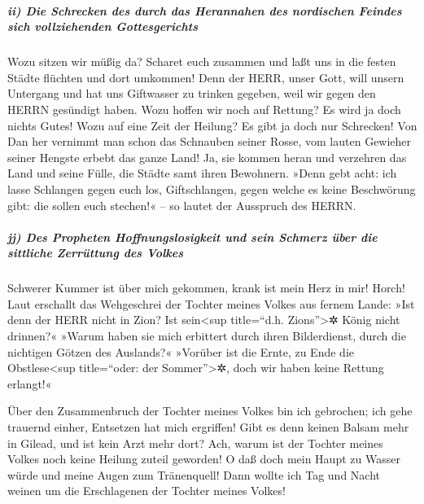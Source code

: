 \hypertarget{ii-die-schrecken-des-durch-das-herannahen-des-nordischen-feindes-sich-vollziehenden-gottesgerichts}{%
\subparagraph{ii) Die Schrecken des durch das Herannahen des nordischen
Feindes sich vollziehenden
Gottesgerichts}\label{ii-die-schrecken-des-durch-das-herannahen-des-nordischen-feindes-sich-vollziehenden-gottesgerichts}}

Wozu sitzen wir müßig da? Scharet euch zusammen und laßt
uns in die festen Städte flüchten und dort umkommen! Denn der HERR,
unser Gott, will unsern Untergang und hat uns Giftwasser zu trinken
gegeben, weil wir gegen den HERRN gesündigt haben. Wozu
hoffen wir noch auf Rettung? Es wird ja doch nichts Gutes! Wozu auf eine
Zeit der Heilung? Es gibt ja doch nur Schrecken! Von Dan
her vernimmt man schon das Schnauben seiner Rosse, vom lauten Gewieher
seiner Hengste erbebt das ganze Land! Ja, sie kommen heran und verzehren
das Land und seine Fülle, die Städte samt ihren Bewohnern.
»Denn gebt acht: ich lasse Schlangen gegen euch los,
Giftschlangen, gegen welche es keine Beschwörung gibt: die sollen euch
stechen!« -- so lautet der Ausspruch des HERRN.

\hypertarget{jj-des-propheten-hoffnungslosigkeit-und-sein-schmerz-uxfcber-die-sittliche-zerruxfcttung-des-volkes}{%
\subparagraph{jj) Des Propheten Hoffnungslosigkeit und sein Schmerz über
die sittliche Zerrüttung des
Volkes}\label{jj-des-propheten-hoffnungslosigkeit-und-sein-schmerz-uxfcber-die-sittliche-zerruxfcttung-des-volkes}}

Schwerer Kummer ist über mich gekommen, krank ist mein
Herz in mir! Horch! Laut erschallt das Wehgeschrei der
Tochter meines Volkes aus fernem Lande: »Ist denn der HERR nicht in
Zion? Ist sein\textless sup title=``d.h. Zions''\textgreater✲ König
nicht drinnen?« »Warum haben sie mich erbittert durch ihren
Bilderdienst, durch die nichtigen Götzen des Auslands?«
»Vorüber ist die Ernte, zu Ende die Obstlese\textless sup
title=``oder: der Sommer''\textgreater✲, doch wir haben keine Rettung
erlangt!«

Über den Zusammenbruch der Tochter meines Volkes bin ich
gebrochen; ich gehe trauernd einher, Entsetzen hat mich ergriffen!
Gibt es denn keinen Balsam mehr in Gilead, und ist kein
Arzt mehr dort? Ach, warum ist der Tochter meines Volkes noch keine
Heilung zuteil geworden! O daß doch mein Haupt zu Wasser
würde und meine Augen zum Tränenquell! Dann wollte ich Tag und Nacht
weinen um die Erschlagenen der Tochter meines Volkes!

